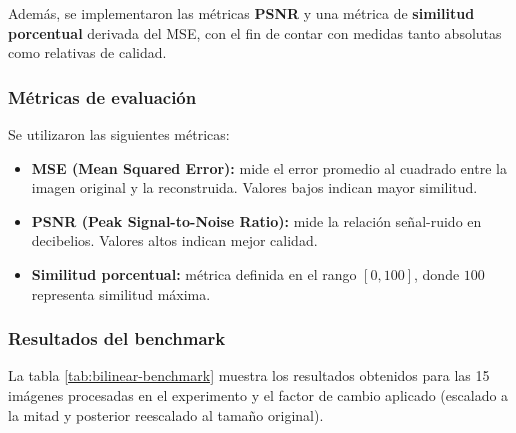 \documentclass[12pt,a4paper]{article}
\begin{document}
Además, se implementaron las métricas \textbf{PSNR} y una métrica de 
\textbf{similitud porcentual} derivada del MSE, con el fin de contar 
con medidas tanto absolutas como relativas de calidad.

\subsubsection{Métricas de evaluación}
Se utilizaron las siguientes métricas:
\begin{itemize}
    \item \textbf{MSE (Mean Squared Error):} mide el error promedio al cuadrado 
    entre la imagen original y la reconstruida. Valores bajos indican mayor similitud.
    \item \textbf{PSNR (Peak Signal-to-Noise Ratio):} mide la relación señal-ruido 
    en decibelios. Valores altos indican mejor calidad.
    \item \textbf{Similitud porcentual:} métrica definida en el rango $[0,100]$, 
    donde $100$ representa similitud máxima.
\end{itemize}

\subsubsection{Resultados del benchmark}
La tabla \ref{tab:bilinear-benchmark} muestra los resultados obtenidos 
para las 15 imágenes procesadas en el experimento y el factor de cambio aplicado 
(escalado a la mitad y posterior reescalado al tamaño original).
\end{document}
